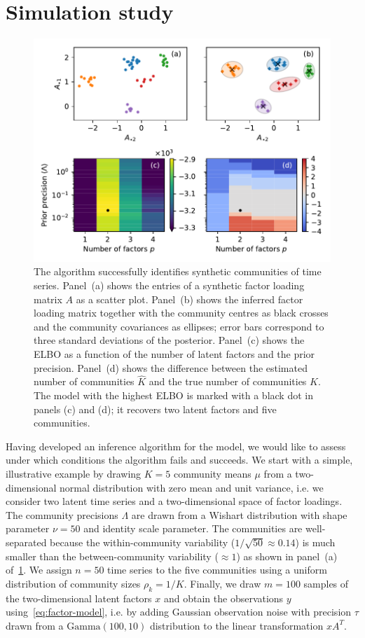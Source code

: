 \documentclass[onecolumn,pre,superscriptaddress, longbibliography, nofootinbib, notitlepage]{revtex4-1}
\newcommand{\dgamma}{\mathrm{Gamma}}
\begin{document}
\section{\label{sec:simulation}Simulation study}

\begin{figure}
    \includegraphics{synthetic-sweep.pdf}
    \caption{\label{fig:synthetic-sweep} The algorithm successfully identifies synthetic communities of time series. Panel~(a) shows the entries of a synthetic factor loading matrix $A$ as a scatter plot. Panel~(b) shows the inferred factor loading matrix together with the community centres as black crosses and the community covariances as ellipses; error bars correspond to three standard deviations of the posterior. Panel~(c) shows the ELBO as a function of the number of latent factors and the prior precision. Panel~(d) shows the difference between the estimated number of communities $\hat K$ and the true number of communities $K$. The model with the highest ELBO is marked with a black dot in panels (c) and (d); it recovers two latent factors and five communities.}

\end{figure}

Having developed an inference algorithm for the model, we would like to assess under which conditions the algorithm fails and succeeds. We start with a simple, illustrative example by drawing $K=5$ community means $\mu$ from a two-dimensional normal distribution with zero mean and unit variance, i.e. we consider two latent time series and a two-dimensional space of factor loadings. The community precisions $\Lambda$ are drawn from a Wishart distribution with shape parameter $\nu=50$ and identity scale parameter. The communities are well-separated because the within-community variability ($1 / \sqrt{50}\approx 0.14$) is much smaller than the between-community variability ($\approx 1$) 
as shown in panel~(a) of~\cref{fig:synthetic-sweep}. We assign $n=50$ time series to the five communities using a uniform distribution of community sizes $\rho_k=1/K$. Finally, we draw $m=100$ samples of the two-dimensional latent factors $x$ 
and obtain the observations $y$ using~\cref{eq:factor-model}, i.e. by adding Gaussian observation noise with precision $\tau$ drawn from a $\dgamma(100, 10)$ distribution to the linear transformation $xA^T$.
\end{document}

